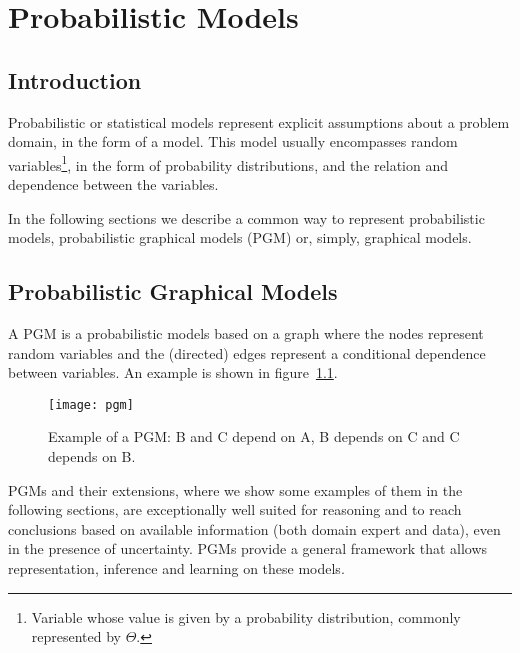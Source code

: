 \chapter{Probabilistic Models} \label{chap:models}

\section*{}

\section{Introduction}

Probabilistic or statistical models represent explicit assumptions about a problem domain, in the form of a model. This model usually encompasses random variables\footnote{Variable whose value is given by a probability distribution, commonly represented by $\Theta$.}, in the form of probability distributions, and the relation and dependence between the variables.~\cite{Winn2013}

In the following sections we describe a common way to represent probabilistic models, probabilistic graphical models (PGM) or, simply, graphical models.

\section{Probabilistic Graphical Models}

A PGM is a probabilistic models based on a graph where the nodes represent random variables and the (directed) edges represent a conditional dependence between variables. An example is shown in figure~\ref{fig:pgm}.

\begin{figure}[h]
	\begin{center}
		\leavevmode
		\texttt{[image: pgm]}
		\caption{Example of a PGM: B and C depend on A, B depends on C and C depends on B. }
		\label{fig:pgm}
	\end{center}
\end{figure}

PGMs and their extensions, where we show some examples of them in the following sections, are exceptionally well suited for reasoning and to reach conclusions based on available information (both domain expert and data), even in the presence of uncertainty. PGMs provide a general framework that allows representation, inference and learning on these models.~\cite{koller2009probabilistic}

